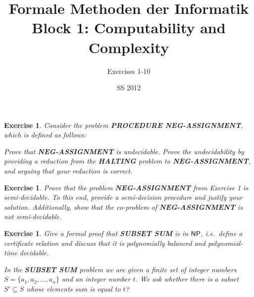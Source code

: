 \documentclass [11pt]{article}
\title{Formale Methoden der Informatik \\
Block 1: Computability and Complexity }
\author{Exercises 1-10}
\date{SS 2012}
\newtheorem{exercise}[theorem]{Exercise}
\newcommand{\ccfont}[1]{\protect\mathsf{#1}}
\newcommand{\NP}{\ccfont{NP}}
\begin{document}
\maketitle


\begin{exercise}
  Consider the problem \textbf{PROCEDURE NEG-ASSIGNMENT}, which is defined
  as follows:

  \begin{center}
  \end{center}
  Prove that \textbf{NEG-ASSIGNMENT} is undecidable. Prove the undecidability
  by providing a reduction from the \textbf{HALTING} problem to
  \textbf{NEG-ASSIGNMENT}, and arguing that your reduction is correct.
\end{exercise}

%
%

\begin{exercise}
  Prove that the problem \textbf{NEG-ASSIGNMENT} from Exercise 1 is semi-decidable. 
To this end, provide a semi-decision procedure and justify your solution. Additionally,  show that the co-problem of \textbf{NEG-ASSIGNMENT} is not semi-decidable.
\end{exercise}


%
%

\begin{exercise}
  Give a formal proof that \textbf{SUBSET SUM} is in $\NP$, i.e.\, define a
  certificate relation and discuss that it is polynomially balanced and
  polynomial-time decidable.
  
   \smallskip
    
  \noindent In the \textbf{SUBSET SUM} problem we are given a finite set of integer numbers $S=\{a_1, a_2, \ldots, a_n\}$ and an integer number $t$. We ask whether there is a subset $S'\subseteq S$ whose elements sum is equal to $t$?
  
\end{exercise}
\end{document}
